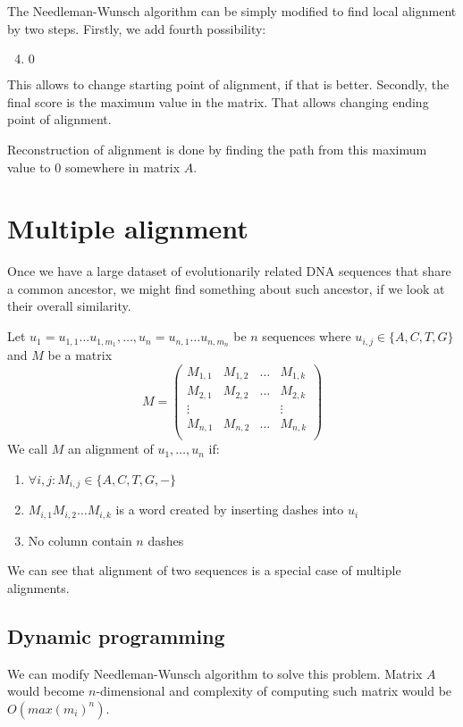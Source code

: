 The Needleman-Wunsch algorithm can be simply modified to find local alignment by two steps.
Firstly, we add fourth possibility:
\begin{enumerate}
 \setcounter{enumi}{3}
\item $0$
\end{enumerate}
This allows to change starting point of alignment, if that is better.
Secondly, the final score is the maximum value in the matrix. That allows changing ending point of alignment.

Reconstruction of alignment is done by finding the path from this maximum value to $0$ somewhere in matrix $A$.

\section{Multiple alignment}
Once we have a large dataset of evolutionarily related DNA sequences that share a common ancestor, we might find something about such ancestor, if we look at their overall similarity.

\begin{definition}
Let $u_1=u_{1,1} \dots u_{1,m_1}, \ldots, u_n=u_{n,1} \dots u_{n,m_n}$ be $n$ sequences where $u_{i,j} \in \{A, C, T, G\}$ and $M$ be a matrix
$$M=
\begin{pmatrix}
  M_{1,1} & M_{1,2} & \dots & M_{1,k} \\
  M_{2,1} & M_{2,2} & \dots & M_{2,k} \\
  \vdots&&&\vdots\\
  M_{n,1} & M_{n,2} & \dots & M_{n,k} \\
\end{pmatrix}$$
We call $M$ an alignment of $u_1, \dots, u_n$ if:
\begin{enumerate}
\item $\forall i,j : M_{i,j}\in \{A,C,T,G,-\}$
\item $M_{i,1} M_{i,2} \dots M_{i,k}$ is a word created by inserting dashes into $u_i$
\item No column contain $n$ dashes
\end{enumerate}
\end{definition}

We can see that alignment of two sequences is a special case of multiple alignments.

\subsection{Dynamic programming}
We can modify Needleman-Wunsch algorithm to solve this problem.
Matrix $A$ would become $n$-dimensional and complexity of computing such matrix would be $O(max(m_i)^n)$.

